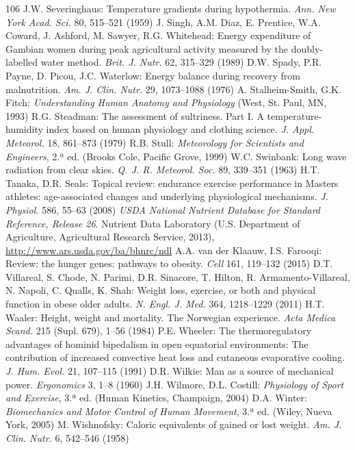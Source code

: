 \documentclass[12pt]{book}
\begin{document}
\begin{thebibliography}{106}
   J.W. Severinghaus: Temperature gradients during hypothermia. \textit{Ann. New York Acad. Sci.} 80, 515--521 (1959)
   J. Singh, A.M. Diaz, E. Prentice, W.A. Coward, J. Ashford, M. Sawyer, R.G. Whitehead: Energy expenditure of Gambian women during peak agricultural activity measured by the doubly-labelled water method. \textit{Brit. J. Nutr.} 62, 315--329 (1989)
   D.W. Spady, P.R. Payne, D. Picou, J.C. Waterlow: Energy balance during recovery from malnutrition. \textit{Am. J. Clin. Nutr.} 29, 1073--1088 (1976)
   A. Stalheim-Smith, G.K. Fitch: \textit{Understanding Human Anatomy and Physiology} (West, St. Paul, MN, 1993)
   R.G. Steadman: The assessment of sultriness. Part I. A temperature-humidity index based on human physiology and clothing science. \textit{J. Appl. Meteorol.} 18, 861--873 (1979)
   R.B. Stull: \textit{Meteorology for Scientists and Engineers}, 2.ª ed. (Brooks Cole, Pacific Grove, 1999)
   W.C. Swinbank: Long wave radiation from clear skies. \textit{Q. J. R. Meteorol. Soc.} 89, 339--351 (1963)
   H.T. Tanaka, D.R. Seals: Topical review: endurance exercise performance in Masters athletes: age-associated changes and underlying physiological mechanisms. \textit{J. Physiol.} 586, 55--63 (2008)
   \textit{USDA National Nutrient Database for Standard Reference, Release 26}. Nutrient Data Laboratory (U.S. Department of Agriculture, Agricultural Research Service, 2013), \url{http://www.ars.usda.gov/ba/bhnrc/ndl}
   A.A. van der Klaauw, I.S. Farooqi: Review: the hunger genes: pathways to obesity. \textit{Cell} 161, 119--132 (2015)
   D.T. Villareal, S. Chode, N. Parimi, D.R. Sinacore, T. Hilton, R. Armamento-Villareal, N. Napoli, C. Qualls, K. Shah: Weight loss, exercise, or both and physical function in obese older adults. \textit{N. Engl. J. Med.} 364, 1218--1229 (2011)
   H.T. Waaler: Height, weight and mortality. The Norwegian experience. \textit{Acta Medica Scand.} 215 (Supl. 679), 1--56 (1984)
   P.E. Wheeler: The thermoregulatory advantages of hominid bipedalism in open equatorial environments: The contribution of increased convective heat loss and cutaneous evaporative cooling. \textit{J. Hum. Evol.} 21, 107--115 (1991)
   D.R. Wilkie: Man as a source of mechanical power. \textit{Ergonomics} 3, 1--8 (1960)
   J.H. Wilmore, D.L. Costill: \textit{Physiology of Sport and Exercise}, 3.ª ed. (Human Kinetics, Champaign, 2004)
   D.A. Winter: \textit{Biomechanics and Motor Control of Human Movement}, 3.ª ed. (Wiley, Nueva York, 2005)
   M. Wishnofsky: Caloric equivalents of gained or lost weight. \textit{Am. J. Clin. Nutr.} 6, 542--546 (1958)
\end{thebibliography}

\end{document}
